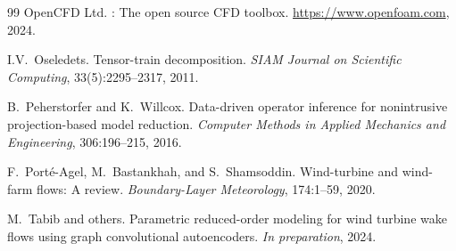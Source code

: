 \documentclass[12pt]{article}
\begin{document}
\begin{thebibliography}{99}
{OpenCFD Ltd.}
: The open source {CFD} toolbox.
\newblock \url{https://www.openfoam.com}, 2024.

I.V.~Oseledets.
\newblock Tensor-train decomposition.
\newblock \emph{SIAM Journal on Scientific Computing}, 33(5):2295--2317, 2011.

B.~Peherstorfer and K.~Willcox.
\newblock Data-driven operator inference for nonintrusive projection-based model reduction.
\newblock \emph{Computer Methods in Applied Mechanics and Engineering}, 306:196--215, 2016.

F.~Port{\'e}-Agel, M.~Bastankhah, and S.~Shamsoddin.
\newblock Wind-turbine and wind-farm flows: A review.
\newblock \emph{Boundary-Layer Meteorology}, 174:1--59, 2020.

M.~Tabib and others.
\newblock Parametric reduced-order modeling for wind turbine wake flows using graph convolutional autoencoders.
\newblock \emph{In preparation}, 2024.

\end{thebibliography}
\end{document}
